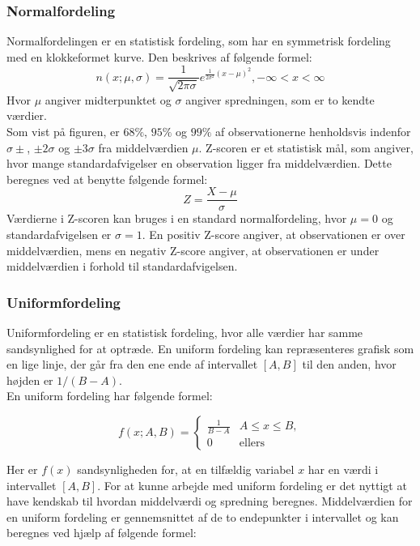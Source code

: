 \subsubsection{Normalfordeling}
Normalfordelingen er en statistisk fordeling, som har en symmetrisk fordeling med en klokkeformet kurve. Den beskrives af følgende formel:
\[n(x;\mu,\sigma) = \frac{1}{\sqrt{2\pi\sigma}}{e}^{\frac{1}{2\sigma^2}(x-\mu)^2} , -\infty < x < \infty \]
Hvor $\mu$ angiver midterpunktet og $\sigma$ angiver spredningen, som er to kendte værdier.
\\
Som vist på figuren, er $68\%$, $95\%$ og $99\%$ af observationerne henholdsvis indenfor $\sigma \pm$, $\pm 2\sigma$ og $\pm 3 \sigma$ fra middelværdien $\mu$. Z-scoren er et statistisk mål, som angiver, hvor mange standardafvigelser en observation ligger fra middelværdien. Dette beregnes ved at benytte følgende formel:
\\
\[Z = \frac{X-\mu}{\sigma}\]
Værdierne i Z-scoren kan bruges i en standard normalfordeling, hvor $\mu = 0$ og standardafvigelsen er $\sigma = 1.$ En positiv Z-score angiver, at observationen er over middelværdien, mens en negativ Z-score angiver, at observationen er under middelværdien i forhold til standardafvigelsen.

\subsubsection{Uniformfordeling}
Uniformfordeling er en statistisk fordeling, hvor alle værdier har samme sandsynlighed for at optræde. En uniform fordeling kan repræsenteres grafisk som en lige linje, der går fra den ene ende af intervallet $[A, B]$ til den anden, hvor højden er $1/(B-A)$.
\\
En uniform fordeling har følgende formel:

\begin{equation}\label{Uniformfordelingmat}
    f(x;A,B) =
    \begin{cases}
        \frac{1}{B-A} & A \le x \le B, \\
        0  &\text{ellers}
    \end{cases}
\end{equation}

\noindent Her er $f(x)$ sandsynligheden for, at en tilfældig variabel $x$ har en værdi i intervallet $[A, B]$. 
For at kunne arbejde med uniform fordeling er det nyttigt at have kendskab til hvordan middelværdi og spredning beregnes.
Middelværdien for en uniform fordeling er gennemsnittet af de to endepunkter i intervallet og kan beregnes ved hjælp af følgende formel:

